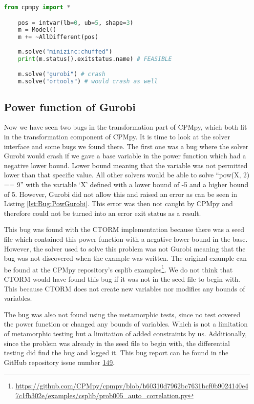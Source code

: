 \begin{lstlisting}[language=python, label={lst:Bug:NotGlobal}, caption={The “negation of global constraints”-bug.}]
	from cpmpy import *

	pos = intvar(lb=0, ub=5, shape=3)
	m = Model()
	m += ~AllDifferent(pos)
	
	m.solve("minizinc:chuffed")
	print(m.status().exitstatus.name) # FEASIBLE

	m.solve("gurobi") # crash
	m.solve("ortools") # would crash as well
\end{lstlisting}

\subsection{Power function of Gurobi}
\label{res:bug:Power}
Now we have seen two bugs in the transformation part of CPMpy, which both fit in the transformation component of CPMpy. It is time to look at the solver interface and some bugs we found there. The first one was a bug where the solver Gurobi would crash if we gave a base variable in the power function which had a negative lower bound. Lower bound meaning that the variable was not permitted lower than that specific value. All other solvers would be able to solve “pow(X, 2) == 9” with the variable ‘X’ defined with a lower bound of -5 and a higher bound of 5. However, Gurobi did not allow this and raised an error as can be seen in Listing \ref{lst:Bug:PowGurobi}. This error was then not caught by CPMpy and therefore could not be turned into an error exit status as a result.

This bug was found with the CTORM implementation because there was a seed file which contained this power function with a negative lower bound in the base. However, the solver used to solve this problem was not Gurobi meaning that the bug was not discovered when the example was written. The original example can be found at the CPMpy repository’s csplib examples\footnote{\url{https://github.com/CPMpy/cpmpy/blob/b60310d7962bc7631bcf0b9024140e47c1fb302e/examples/csplib/prob005_auto_correlation.py}}. We do not think that CTORM would have found this bug if it was not in the seed file to begin with. This because CTORM does not create new variables nor modifies any bounds of variables. 

The bug was also not found using the metamorphic tests, since no test covered the power function or changed any bounds of variables. Which is not a limitation of metamorphic testing but a limitation of added constraints by us. 
Additionally, since the problem was already in the seed file to begin with, the differential testing did find the bug and logged it. This bug report can be found in the GitHub repository issue number \href{https://github.com/CPMpy/cpmpy/issues/149}{149}.

